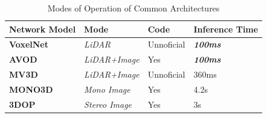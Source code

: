 \begin{table}[h]
	\centering
	\begin{tabular}{|l|l|l|l|}
		\hline
		\textbf{Network Model} & \textbf{Mode}         & \textbf{Code} & \textbf{Inference Time}  \\ \hline
		\textbf{VoxelNet}      & \textit{LiDAR}        & Unnoficial    & \textit{\textbf{100ms}} \\ \hline
		\textbf{AVOD}          & \textit{LiDAR+Image}  & Yes           & \textit{\textbf{100ms}} \\ \hline
		\textbf{MV3D}          & \textit{LiDAR+Image}  & Unnoficial    & 360ms                   \\ \hline
		\textbf{MONO3D}        & \textit{Mono Image}   & Yes           & 4.2s                    \\ \hline
		\textbf{3DOP}          & \textit{Stereo Image} & Yes           & 3s                      \\ \hline
	\end{tabular}
	\caption{Modes of Operation of Common Architectures}
	\label{tab:arch}
\end{table}






%
%
% 
%



